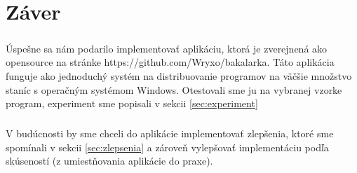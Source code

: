 \chapter*{Záver}
\paragraph{}
Úspešne sa nám podarilo implementovať aplikáciu, ktorá je zverejnená ako opensource na stránke https://github.com/Wryxo/bakalarka. Táto aplikácia funguje ako jednoduchý systém na distribuovanie programov na väčšie množstvo staníc s operačným systémom Windows. Otestovali sme ju na vybranej vzorke program, experiment sme popisali v sekcii \ref{sec:experiment}
\paragraph{}
V budúcnosti by sme chceli do aplikácie implementovať zlepšenia, ktoré sme spomínali v sekcii \ref{sec:zlepsenia} a zároveň vylepšovať implementáciu podľa skúseností (z umiestňovania aplikácie do praxe).